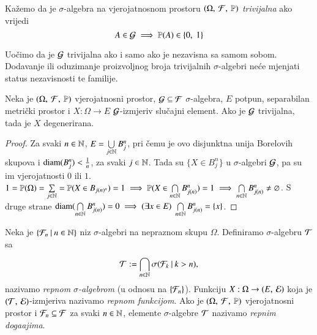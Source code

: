 \begin{defn}    \label{defn:9.5}
    Ka\v zemo da je $\sigma$-algebra na vjerojatnosnom prostoru $(\Omega, \: \mathcal{F}, \: \mathbb{P})$ \emph{trivijalna} ako vrijedi
    \begin{equation*}
        A \in \mathcal{G} \implies \mathbb{P}({A}) \in \{0, \; 1\}
    \end{equation*}
\end{defn}

Uo\v cimo da je $\mathcal{G}$ trivijalna ako i samo ako je nezavisna sa samom sobom.
Dodavanje ili oduzimanje proizvoljnog broja trivijalnih $\sigma$-algebri ne\' ce mjenjati status nezavisnosti te familije.

\begin{lm}  \label{lm:9.6}
    Neka je $(\Omega, \: \mathcal{F}, \: \mathbb{P})$ vjerojatnosni prostor, $\mathcal{G} \subseteq \mathcal{F}$ $\sigma$-algebra, $E$ potpun, separabilan metri\v cki prostor i $X : \Omega \to E$ $\mathcal{G}$-izmjeriv slu\v cajni element.
    Ako je $\mathcal{G}$ trivijalna, tada je $X$ degenerirana.
\end{lm}

\begin{proof}
    Za svaki $n \in \mathbb{N}$, $E = \bigcup\limits_{j \in \mathbb{N}}^{} B_j^n$, pri \v cemu je ovo disjunktna unija Borelovih skupova i $\mathrm{diam}(B_j^n) < \frac{1}{n}$, za svaki $j \in \mathbb{N}$.
    Tada su $\{ X \in B_j^n \}$ u $\sigma$-algebri $\mathcal{G}$, pa su im vjerojatnosti $0$ ili $1$.
    $1 = \mathbb{P}({\Omega}) = \sum\limits_{j \in \mathbb{N}}^{} = \mathbb{P}({X \in B_{j(n)^n}}) = 1 \implies \mathbb{P}({X \in \bigcap\limits_{n \in \mathbb{N}}^{} B_{j(n)}^n}) = 1 \implies \bigcap\limits_{n \in \mathbb{N}}^{} B_{j(n)}^n \neq \varnothing$.
    S druge strane $\mathrm{diam}(\bigcap\limits_{n \in \mathbb{N}}^{}B_{j(n)}^n) = 0 \implies (\exists x \in E) \; \bigcap\limits_{n \in \mathbb{N}}^{} B_{j(n)}^n = \{ x \}$.
\end{proof}

\begin{defn}    \label{defn:9.7}
    Neka je $\{{\mathcal{F}_n} \: | \: {n \in \mathbb{N}}\}$ niz $\sigma$-algebri na nepraznom skupu $\Omega$.
    Definiramo $\sigma$-algebru $\mathcal{T}$ sa
    \begin{equation*}
        \mathcal{T} := \bigcap\limits_{n \in \mathbb{N}}^{} \sigma({\mathcal{F}_k} \: | \: {k > n}),
    \end{equation*}
    nazivamo \emph{repnom $\sigma$-algebrom} (u odnosu na $\{ \mathcal{F}_n \}$).
    Funkciju $X : \Omega \to ({E}, \: {\mathcal{E}})$ koja je $({\mathcal{T}}, \: {\mathcal{E}})$-izmjeriva nazivamo \emph{repnom funkcijom}.
    Ako je $(\Omega, \: \mathcal{F}, \: \mathbb{P})$ vjerojatnosni prostor i $\mathcal{F}_n \subseteq \mathcal{F}$ za svaki $n \in \mathbb{N}$, elemente $\sigma$-algebre $\mathcal{T}$ nazivamo \emph{repnim doga\dj ajima}.
\end{defn}

